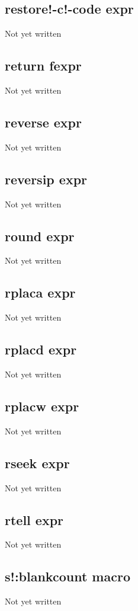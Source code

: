 \documentclass[a4paper,11pt]{article}
\begin{document}
{\subsection{\ttfamily restore!-c!-code expr}
   Not yet written

\subsection{\ttfamily return fexpr}
   Not yet written

\subsection{\ttfamily reverse expr}
   Not yet written

\subsection{\ttfamily reversip expr}
   Not yet written

\subsection{\ttfamily round expr}
   Not yet written

\subsection{\ttfamily rplaca expr}
   Not yet written

\subsection{\ttfamily rplacd expr}
   Not yet written

\subsection{\ttfamily rplacw expr}
   Not yet written

\subsection{\ttfamily rseek expr}
   Not yet written

\subsection{\ttfamily rtell expr}
   Not yet written

\subsection{\ttfamily s!:blankcount macro}
   Not yet written

}
\end{document}
